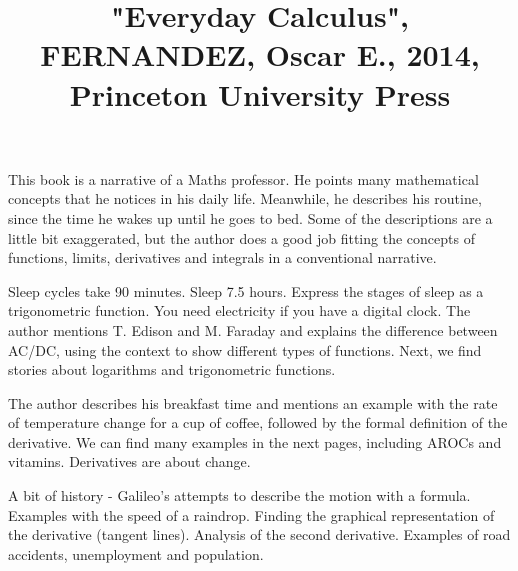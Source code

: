 \documentclass{cornell}
\begin{document}
 

\title{
    \vspace{-3em}
        \begin{tcolorbox}[colframe=white,opacityback=0]
            \begin{tcolorbox}
                \Huge\sffamily "Everyday Calculus", FERNANDEZ, Oscar E., 2014, Princeton University Press
            \end{tcolorbox}
        \end{tcolorbox}
    \vspace{-3em}
}
\maketitle

\begin{tcolorbox}
\end{tcolorbox}


\noindent
This book is a narrative of a Maths professor. He points many mathematical concepts that he notices in his daily life. Meanwhile, he describes his routine, since the time he wakes up until he goes to bed. Some of the descriptions are a little bit exaggerated, but the author does a good job fitting the concepts of functions, limits, derivatives and integrals in a conventional narrative.

%
{Sleep cycles take 90 minutes. Sleep 7.5 hours. Express the stages of sleep as a trigonometric function.}%
{You need electricity if you have a digital clock. The author mentions T. Edison and M. Faraday and explains the difference between AC/DC, using the context to show different types of functions. Next, we find stories about logarithms and trigonometric functions.}%

%
{The author describes his breakfast time and mentions an example with the rate of temperature change for a cup of coffee, followed by the formal definition of the derivative. We can find many examples  in the next pages, including AROCs and vitamins. Derivatives are about change.}%

%
{A bit of history - Galileo's attempts to describe the motion with a formula. Examples with the speed of a raindrop. Finding the graphical representation of the derivative (tangent lines). Analysis of the second derivative. Examples of road accidents, unemployment and population.}%
\end{document}
